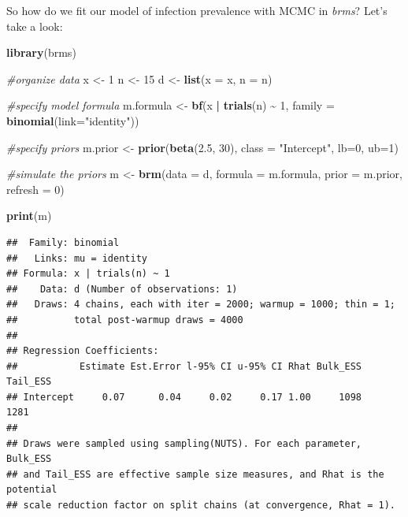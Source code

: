 \documentclass[
]{book}
\newenvironment{Shaded}{\begin{snugshade}}{\end{snugshade}}
\newcommand{\AttributeTok}[1]{\textcolor[rgb]{0.13,0.29,0.53}{#1}}
\newcommand{\CommentTok}[1]{\textcolor[rgb]{0.56,0.35,0.01}{\textit{#1}}}
\newcommand{\DecValTok}[1]{\textcolor[rgb]{0.00,0.00,0.81}{#1}}
\newcommand{\FloatTok}[1]{\textcolor[rgb]{0.00,0.00,0.81}{#1}}
\newcommand{\FunctionTok}[1]{\textcolor[rgb]{0.13,0.29,0.53}{\textbf{#1}}}
\newcommand{\NormalTok}[1]{#1}
\newcommand{\OtherTok}[1]{\textcolor[rgb]{0.56,0.35,0.01}{#1}}
\newcommand{\SpecialCharTok}[1]{\textcolor[rgb]{0.81,0.36,0.00}{\textbf{#1}}}
\newcommand{\StringTok}[1]{\textcolor[rgb]{0.31,0.60,0.02}{#1}}
\begin{document}
So how do we fit our model of infection prevalence with MCMC in \emph{brms}?
Let's take a look:

\begin{Shaded}
\begin{Highlighting}[]
\FunctionTok{library}\NormalTok{(brms)}

\CommentTok{\#organize data}
\NormalTok{x }\OtherTok{\textless{}{-}} \DecValTok{1}
\NormalTok{n }\OtherTok{\textless{}{-}} \DecValTok{15}
\NormalTok{d }\OtherTok{\textless{}{-}} \FunctionTok{list}\NormalTok{(}\AttributeTok{x =}\NormalTok{ x, }\AttributeTok{n =}\NormalTok{ n)}

\CommentTok{\#specify model formula}
\NormalTok{m.formula }\OtherTok{\textless{}{-}} \FunctionTok{bf}\NormalTok{(x }\SpecialCharTok{|} \FunctionTok{trials}\NormalTok{(n) }\SpecialCharTok{\textasciitilde{}} \DecValTok{1}\NormalTok{,}
                \AttributeTok{family =} \FunctionTok{binomial}\NormalTok{(}\AttributeTok{link=}\StringTok{"identity"}\NormalTok{))}

\CommentTok{\#specify priors}
\NormalTok{m.prior }\OtherTok{\textless{}{-}} \FunctionTok{prior}\NormalTok{(}\FunctionTok{beta}\NormalTok{(}\FloatTok{2.5}\NormalTok{, }\DecValTok{30}\NormalTok{), }\AttributeTok{class =} \StringTok{"Intercept"}\NormalTok{, }\AttributeTok{lb=}\DecValTok{0}\NormalTok{, }\AttributeTok{ub=}\DecValTok{1}\NormalTok{)}
              
\CommentTok{\#simulate the priors}
\NormalTok{m }\OtherTok{\textless{}{-}} \FunctionTok{brm}\NormalTok{(}\AttributeTok{data =}\NormalTok{ d,}
         \AttributeTok{formula =}\NormalTok{ m.formula,}
         \AttributeTok{prior =}\NormalTok{ m.prior,}
         \AttributeTok{refresh =} \DecValTok{0}\NormalTok{)}

\FunctionTok{print}\NormalTok{(m)}
\end{Highlighting}
\end{Shaded}

\begin{verbatim}
##  Family: binomial 
##   Links: mu = identity 
## Formula: x | trials(n) ~ 1 
##    Data: d (Number of observations: 1) 
##   Draws: 4 chains, each with iter = 2000; warmup = 1000; thin = 1;
##          total post-warmup draws = 4000
## 
## Regression Coefficients:
##           Estimate Est.Error l-95% CI u-95% CI Rhat Bulk_ESS Tail_ESS
## Intercept     0.07      0.04     0.02     0.17 1.00     1098     1281
## 
## Draws were sampled using sampling(NUTS). For each parameter, Bulk_ESS
## and Tail_ESS are effective sample size measures, and Rhat is the potential
## scale reduction factor on split chains (at convergence, Rhat = 1).
\end{verbatim}
\end{document}
